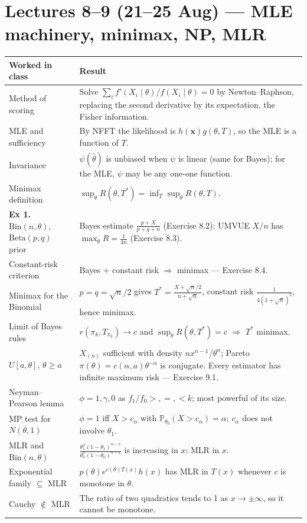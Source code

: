 \documentclass[11pt]{article}
\newcommand{\Prob}{\mathbb{P}}
\begin{document}
\section*{Lectures 8--9 (21--25 Aug) --- MLE machinery, minimax, NP, MLR}
\begin{longtable}{@{}p{7.2cm}p{9.0cm}@{}}
\toprule
\textbf{Worked in class} & \textbf{Result} \\
\midrule
Method of scoring &
Solve $\sum_i f'(X_i\mid\theta)/f(X_i\mid\theta)=0$ by Newton--Raphson, replacing the second
derivative by its expectation, the Fisher information. \\
MLE and sufficiency &
By NFFT the likelihood is $h(\mathbf x)g(\theta,T)$, so the MLE is a function of $T$. \\
Invariance &
$\psi(\hat\theta)$ is unbiased when $\psi$ is linear (same for Bayes); for the MLE, $\psi$ may
be any one-one function. \\
Minimax definition &
$\sup_\theta R(\theta,T^*)=\inf_T\sup_\theta R(\theta,T)$. \\
\textbf{Ex 1.} $\mathrm{Bin}(n,\theta)$, $\mathrm{Beta}(p,q)$ prior &
Bayes estimate $\frac{p+X}{p+q+n}$ (Exercise 8.2); UMVUE $X/n$ has
$\max_\theta R=\frac{1}{4n}$ (Exercise 8.3). \\
Constant-risk criterion &
Bayes $+$ constant risk $\Rightarrow$ minimax --- Exercise 8.4. \\
Minimax for the Binomial &
$p=q=\sqrt n/2$ gives $T^*=\frac{X+\sqrt n/2}{n+\sqrt n}$, constant risk
$\frac{1}{4(1+\sqrt n)^2}$, hence minimax. \\
Limit of Bayes rules &
$r(\pi_k,T_{\pi_k})\to c$ and $\sup_\theta R(\theta,T^*)=c$ $\Rightarrow$ $T^*$ minimax. \\
$U[a,\theta]$, $\theta\ge a$ &
$X_{(n)}$ sufficient with density $nx^{n-1}/\theta^n$; Pareto
$\pi(\theta)=c(\alpha,a)\theta^{-\alpha}$ is conjugate. Every estimator has infinite maximum
risk --- Exercise 9.1. \\
Neyman--Pearson lemma &
$\phi=1,\gamma,0$ as $f_1/f_0>,=,<k$; most powerful of its size. \\
MP test for $N(\theta,1)$ &
$\phi=1$ iff $X>c_\alpha$ with $\Prob_{\theta_0}(X>c_\alpha)=\alpha$; $c_\alpha$ does not
involve $\theta_1$. \\
MLR and $\mathrm{Bin}(n,\theta)$ &
$\frac{\theta_1^x(1-\theta_1)^{n-x}}{\theta_0^x(1-\theta_0)^{n-x}}$ is increasing in $x$:
MLR in $x$. \\
Exponential family $\subseteq$ MLR &
$p(\theta)e^{c(\theta)T(x)}h(x)$ has MLR in $T(x)$ whenever $c$ is monotone in $\theta$. \\
Cauchy $\notin$ MLR &
The ratio of two quadratics tends to 1 as $x\to\pm\infty$, so it cannot be monotone. \\
\bottomrule
\end{longtable}
\end{document}
